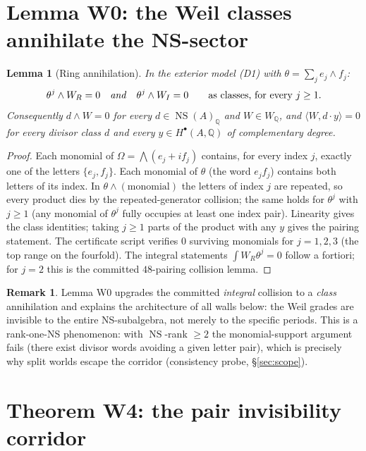 \documentclass[11pt]{article}
\newtheorem{lemma}[theorem]{Lemma}
\theoremstyle{definition}
\newtheorem{remark}[theorem]{Remark}
\newcommand{\NS}{\operatorname{NS}}
\newcommand{\Q}{\mathbb{Q}}
\newcommand{\WQ}{W_{\Q}}
\begin{document}
\section{Lemma W0: the Weil classes annihilate the NS-sector}\label{sec:ring}

\begin{lemma}[Ring annihilation]\label{lem:w0}
In the exterior model (D1) with $\theta=\sum_j e_j\wedge f_j$:
\[
\theta^j\wedge W_R=0\quad\text{\emph{and}}\quad \theta^j\wedge W_I=0
\qquad\text{as classes, for every } j\ge 1.
\]
Consequently $d\wedge W=0$ for every $d\in\NS(A)_\Q$ and $W\in\WQ$, and
$\langle W, d\cdot y\rangle=0$ for every divisor class $d$ and every
$y\in H^\bullet(A,\Q)$ of complementary degree.
\end{lemma}

\begin{proof}
Each monomial of $\Omega=\bigwedge(e_j+if_j)$ contains, for every index $j$,
exactly one of the letters $\{e_j,f_j\}$. Each monomial of $\theta$
(the word $e_jf_j$) contains both letters of its index. In
$\theta\wedge(\text{monomial})$ the letters of index $j$ are repeated, so
every product dies by the repeated-generator collision; the same holds for
$\theta^j$ with $j\ge 1$ (any monomial of $\theta^j$ fully occupies at least
one index pair). Linearity gives the class identities; taking $j\ge 1$ parts
of the product with any $y$ gives the pairing statement. The certificate
script verifies $0$ surviving monomials for $j=1,2,3$ (the top range on the
fourfold). The integral statements $\int W_R\theta^j=0$ follow a fortiori;
for $j=2$ this is the committed $48$-pairing collision lemma.
\end{proof}

\begin{remark}
Lemma W0 upgrades the committed \emph{integral} collision to a \emph{class}
annihilation and explains the architecture of all walls below: the Weil
grades are invisible to the entire NS-subalgebra, not merely to the specific
periods. This is a rank-one-NS phenomenon: with $\NS$-rank $\ge 2$ the
monomial-support argument fails (there exist divisor words avoiding a given
letter pair), which is precisely why split worlds escape the corridor
(consistency probe, \S\ref{sec:scope}).
\end{remark}

\section{Theorem W4: the pair invisibility corridor}\label{sec:w4}
\end{document}
